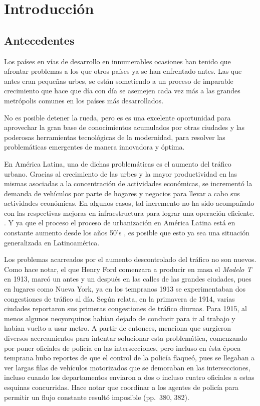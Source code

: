 
\chapter{Introducción} %
\graphicspath{{./../imagenes/}}
\linespread{1.3}
\hypertarget{antecedentes}{%
\section{Antecedentes}\label{antecedentes}}

Los países en vías de desarrollo en innumerables ocasiones han tenido
que afrontar problemas a los que otros países ya se han enfrentado
antes. Las que antes eran pequeñas urbes, se están sometiendo a un
proceso de imparable crecimiento que hace que día con día se asemejen
cada vez más a las grandes metrópolis comunes en los países más
desarrollados.

No es posible detener la rueda, pero es es una excelente oportunidad
para aprovechar la gran base de conocimientos acumulados por otras
ciudades y las poderosas herramientas tecnológicas de la modernidad,
para resolver las problemáticas emergentes de manera innovadora y
óptima.

En América Latina, una de dichas problemáticas es el aumento del tráfico
urbano. Gracias al crecimiento de las urbes y la mayor productividad en
las mismas asociadas a la concentración de actividades económicas, se
incrementó la demanda de vehículos por parte de hogares y negocios para
llevar a cabo sus actividades económicas. En algunos casos, tal
incremento no ha sido acompañado con las respectivas mejoras en
infraestructura para lograr una operación eficiente.
\parencite[1]{Medina-Durango2011}. Y ya que el proceso el proceso de
urbanización en América Latina está en constante aumento desde los años
50's \parencite[27]{PdaCunha2009}, es posible que esto ya sea una
situación generalizada en Latinoamérica.

Los problemas acarreados por el aumento descontrolado del tráfico no son
nuevos. Como \textcite{McShane1999} hace notar, el que Henry Ford
comenzara a producir en masa el \emph{Modelo T} en 1913, marcó un antes
y un después en las calles de las grandes ciudades, pues en lugares como
Nueva York, ya en los tempranos 1913 se experimentaban dos congestiones
de tráfico al día. Según relata, en la primavera de 1914, varias
ciudades reportaron sus primeras congestiones de tráfico diurnas. Para
1915, al menos algunos neoyorquinos habían dejado de conducir para ir al
trabajo y habían vuelto a usar metro. A partir de entonces, menciona que
surgieron diversos acercamientos para intentar solucionar esta
problemática, comenzando por poner oficiales de policía en las
intersecciones, pero incluso en ésta época temprana hubo reportes de que
el control de la policía flaqueó, pues se llegaban a ver largas filas de
vehículos motorizados que se demoraban en las intersecciones, incluso
cuando los departamentos enviaron a dos o incluso cuatro oficiales a
estas esquinas concurridas. Hace notar que coordinar a los agentes de
policía para permitir un flujo constante resultó imposible (pp.~380,
382).


